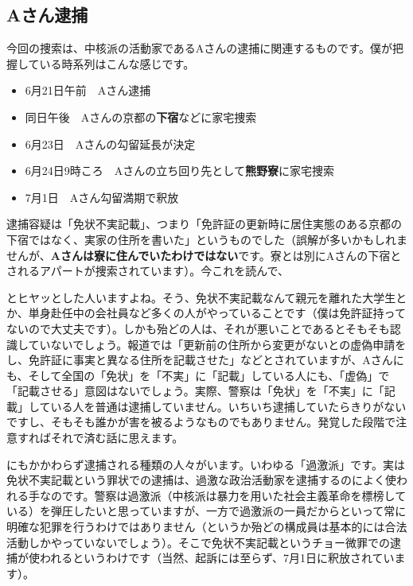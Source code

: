 \subsection{Aさん逮捕}

今回の捜索は、中核派の活動家であるAさんの逮捕に関連するものです。僕が把握している時系列はこんな感じです。

\begin{itemize}
  \item 6月21日午前　Aさん逮捕
  \item 同日午後　Aさんの京都の\textbf{下宿}などに家宅捜索
  \item 6月23日　Aさんの勾留延長が決定
  \item 6月24日9時ころ　Aさんの立ち回り先として\textbf{熊野寮}に家宅捜索
  \item 7月1日　Aさん勾留満期で釈放
\end{itemize}

逮捕容疑は「免状不実記載」、つまり「免許証の更新時に居住実態のある京都の下宿ではなく、実家の住所を書いた」というものでした（誤解が多いかもしれませんが、\textbf{Aさんは寮に住んでいたわけではない}です。寮とは別にAさんの下宿とされるアパートが捜索されています）。今これを読んで、
\begin{quote}
\end{quote}
とヒヤッとした人いますよね。そう、免状不実記載なんて親元を離れた大学生とか、単身赴任中の会社員など多くの人がやっていることです（僕は免許証持ってないので大丈夫です）。しかも殆どの人は、それが悪いことであるとそもそも認識していないでしょう。報道では「更新前の住所から変更がないとの虚偽申請をし、免許証に事実と異なる住所を記載させた」などとされていますが、Aさんにも、そして全国の「免状」を「不実」に「記載」している人にも、「虚偽」で「記載させる」意図はないでしょう。実際、警察は「免状」を「不実」に「記載」している人を普通は逮捕していません。いちいち逮捕していたらきりがないですし、そもそも誰かが害を被るようなものでもありません。発覚した段階で注意すればそれで済む話に思えます。

にもかかわらず逮捕される種類の人々がいます。いわゆる「過激派」です。実は免状不実記載という罪状での逮捕は、過激な政治活動家を逮捕するのによく使われる手なのです。警察は過激派（中核派は暴力を用いた社会主義革命を標榜している）を弾圧したいと思っていますが、一方で過激派の一員だからといって常に明確な犯罪を行うわけではありません（というか殆どの構成員は基本的には合法活動しかやっていないでしょう）。そこで免状不実記載というチョー微罪での逮捕が使われるというわけです（当然、起訴には至らず、7月1日に釈放されています）。

